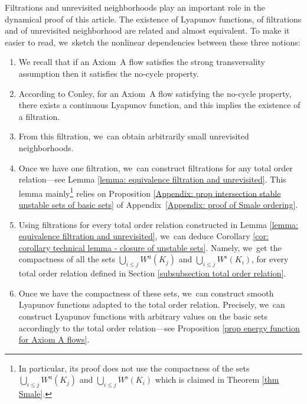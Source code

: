 \documentclass[11pt]{article}
\newcommand{\rs}{\mathrm{s}}
\newcommand{\ru}{\mathrm{u}}
\theoremstyle{definition}
\theoremstyle{plain}
\begin{document}
Filtrations and unrevisited neighborhoods play an important role in the dynamical proof of this article. The existence of Lyapunov functions, of filtrations and of unrevisited neighborhood are related and almost equivalent. To make it easier to read, we~sketch the nonlinear dependencies between these three notions:
\begin{enumerate}
\item We recall that if an Axiom~A flow satisfies the strong transversality assumption then it satisfies the no-cycle property.
\item According to Conley, for an Axiom~A flow satisfying the no-cycle property, there exists a continuous Lyapunov function, and this implies the existence of a filtration.
\item From this filtration, we~can obtain arbitrarily small unrevisited neighborhoods.
\item Once we have one filtration, we~can construct filtrations for any total order relation---see Lemma \ref{lemma: equivalence filtration and unrevisited}. This lemma mainly\footnote{In particular, its proof does not use the compactness of the sets $ \bigcup_{i \leq j} W^\ru (K_j)$ and $ \bigcup_{i \leq j} W^\rs (K_i)$ which is claimed in Theorem \ref{thm Smale}.} relies on Proposition \ref{Appendix: prop intersection stable unstable sets of basic sets} of Appendix~\ref{Appendix: proof of Smale ordering}.
\item Using filtrations for every total order relation constructed in Lemma \ref{lemma: equivalence filtration and unrevisited}, we~can deduce Corollary \ref{cor: corollary technical lemma - closure of unstable sets}. Namely, we~get the compactness of all the sets $ \bigcup_{i \leq j} W^\ru (K_j)$ and $ \bigcup_{i \leq j} W^\rs (K_i)$, for every total order relation defined in Section \ref{subsubsection total order relation}.
\item Once we have the compactness of these sets, we~can construct smooth Lyapunov functions adapted to the total order relation. Precisely, we~can construct Lyapunov functions with arbitrary values on the basic sets accordingly to the total order relation---see Proposition \ref{prop energy function for Axiom A flows}.
\end{enumerate}
\end{document}
